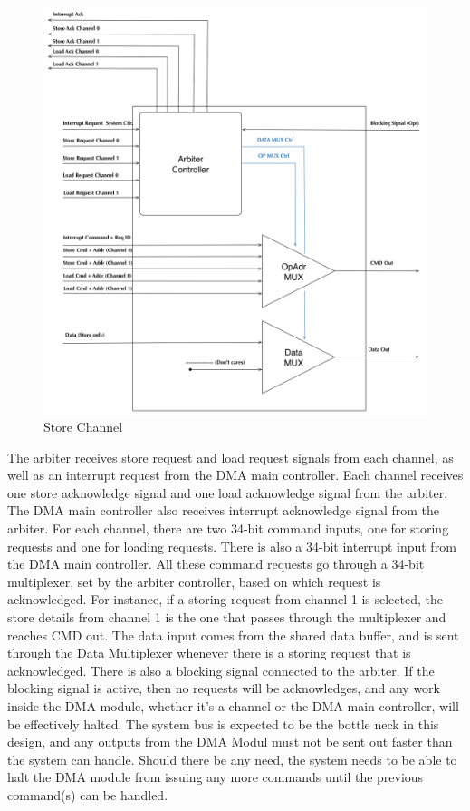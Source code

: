 \begin{appendix}
\begin{figure}[h!]
    \centering
    \includegraphics[width=1.0\textwidth]{Figures/DMA/Arbiter}
    \caption{Store Channel}
    \label{fig:arbiter}
\end{figure}

The arbiter receives store request and load request signals from each channel, as well as an interrupt request from the DMA main controller.
Each channel receives one store acknowledge signal and one load acknowledge signal from the arbiter.
The DMA main controller also receives interrupt acknowledge signal from the arbiter.
For each channel, there are two 34-bit command inputs, one for storing requests and one for loading requests.
There is also a 34-bit interrupt input from the DMA main controller.
All these command requests go through a 34-bit multiplexer, set by the arbiter controller, based on which request is acknowledged.
For instance, if a storing request from channel 1 is selected, the store details from channel 1 is the one that passes through the multiplexer and reaches CMD out.
The data input comes from the shared data buffer, and is sent through the Data Multiplexer whenever there is a storing request that is acknowledged.
There is also a blocking signal connected to the arbiter.
If the blocking signal is active, then no requests will be acknowledges, and any work inside the DMA module, whether it's a channel or the DMA main controller, will be effectively halted.
The system bus is expected to be the bottle neck in this design, and any outputs from the DMA Modul must not be sent out faster than the system can handle.
Should there be any need, the system needs to be able to halt the DMA module from issuing any more commands until the previous command(s) can be handled. 


\end{appendix}
